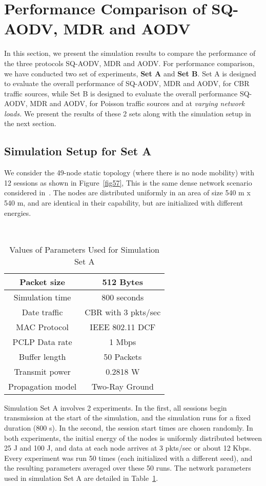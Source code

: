 \section{Performance Comparison of SQ-AODV, MDR and AODV}
\label{comp-sq-aodv-mdr-and-aodv}
In this section, we present the simulation results to compare the performance of the three protocols SQ-AODV, MDR and AODV. For performance comparison, we have conducted two set of experiments, \textbf{Set A} and \textbf{Set B}. Set A is designed to evaluate the overall performance of SQ-AODV, MDR and AODV, for CBR traffic sources, while Set B is designed to evaluate the overall performance SQ-AODV, MDR and AODV, for Poisson traffic sources and at {\it varying network loads.} We present the results of these 2 sets along with the simulation setup in the next section.

\subsection{Simulation Setup for Set A}

We consider the 49-node static topology (where there is no node mobility) with 12 sessions as shown in Figure~\ref{fig57}, This is the same dense network scenario considered in~\cite{mdr}. The nodes are distributed uniformly in an area of size 540 m x 540 m, and are identical in their capability, but 
are initialized with different energies.

\begin{table}[htbp]
 \centering
  \caption{Values of Parameters Used for Simulation Set A} 
  \hfill \\
  \begin{tabular}{|c|c|}
  \hline
  Packet size & 512 Bytes\\
  \hline
  Simulation time & 800 seconds\\
  \hline
  Date traffic & CBR with 3 pkts/sec\\
  \hline
  MAC Protocol & IEEE 802.11 DCF\\
  \hline
  PCLP Data rate & 1 Mbps\\
  \hline
  Buffer length & 50 Packets\\
  \hline
  Transmit power & 0.2818 W\\
  \hline
  Propagation model & Two-Ray Ground\\
  \hline
  \end{tabular}
  \label{tab55}
\end{table}

Simulation Set A involves 2 experiments. In the first, all sessions begin transmission at the start of the simulation, and the simulation runs for a fixed duration (800 s). In the second, the session start times are chosen 
randomly. In both experiments, the initial energy of the nodes is uniformly distributed between 25 J and 100 J, and data at each node arrives at
3 pkts/sec or about 12 Kbps. Every experiment was run 50 times (each initialized with a different seed), and the resulting parameters averaged over these 50 runs. The network parameters used in simulation Set A are detailed in Table~\ref{tab55}.

